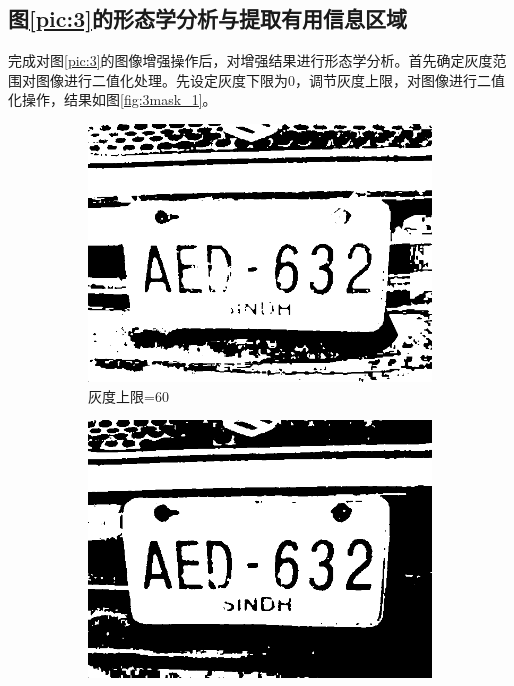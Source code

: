 \documentclass[a4paper]{ctexart}
\newcommand{\outwfour}{0.23\textwidth}
\begin{document}
\begin{spacing}{1.35}
	\subsection{图\ref{pic:3}的形态学分析与提取有用信息区域}
	完成对图\ref{pic:3}的图像增强操作后，对增强结果进行形态学分析。首先确定灰度范围对图像进行二值化处理。先设定灰度下限为0，调节灰度上限，对图像进行二值化操作，结果如图\ref{fig:3mask_1}。
	\begin{figure}[htbp]
		\centering
		\begin{subfigure}[t]{\outwfour}
			\centering
			\includegraphics[width=\textwidth]{figure/3mask_1_1.png}
			\caption{灰度上限=60}
		\end{subfigure}
		\begin{subfigure}[t]{\outwfour}
			\centering
			\includegraphics[width=\textwidth]{figure/3mask_1_2.png}

\end{subfigure}
\end{figure}
\end{spacing}
\end{document}
